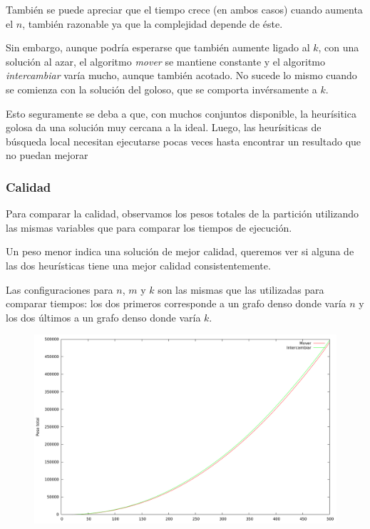También se puede apreciar que el tiempo crece (en ambos casos) cuando aumenta
el $n$, también razonable ya que la complejidad depende de éste.

Sin embargo, aunque podría esperarse que también aumente ligado al $k$, con una
solución al azar, el algoritmo \textit{mover} se mantiene constante y el
algoritmo \textit{intercambiar} varía mucho, aunque también acotado. No sucede
lo mismo cuando se comienza con la solución del goloso, que se comporta
invérsamente a $k$.

Esto seguramente se deba a que, con muchos conjuntos disponible, la heurísitica
golosa da una solución muy cercana a la ideal. Luego, las heurísiticas de
búsqueda local necesitan ejecutarse pocas veces hasta encontrar un resultado
que no puedan mejorar

\newpage \subsubsection{Calidad}

Para comparar la calidad, observamos los pesos totales de la partición
utilizando las mismas variables que para comparar los tiempos de ejecución.

Un peso menor indica una solución de mejor calidad, queremos ver si alguna
de las dos heurísticas tiene una mejor calidad consistentemente.

Las configuraciones para $n$, $m$ y $k$ son las mismas que las utilizadas para
comparar tiempos: los dos primeros corresponde a un grafo denso donde varía $n$
y los dos últimos a un grafo denso donde varía $k$.
\vspace*{0.5cm}

\begin{figure}[H]
  \begin{center}
    \includegraphics[scale=0.35]{imagenes/local-goloso-n-peso.png}
  \end{center}
\end{figure}

